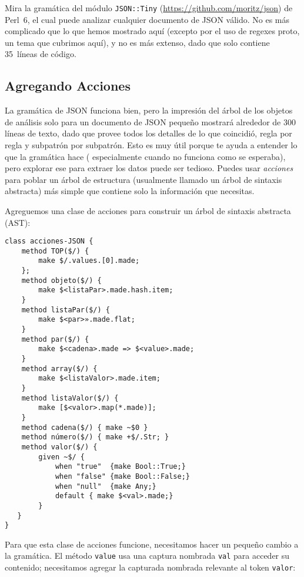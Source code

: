 Mira la gramática del módulo {\tt JSON::Tiny} 
(\url{https://github.com/moritz/json}) de Perl~6,
el cual puede analizar cualquier documento de JSON válido.
No es más complicado que lo que hemos mostrado aquí (excepto
por el uso de regexes proto, un tema que cubrimos aquí),
y no es más extenso, dado que solo contiene 35~líneas de
código.

\subsection{Agregando Acciones}

La gramática de JSON funciona bien, pero la impresión
del árbol de los objetos de análisis solo para un documento
de JSON pequeño mostrará alrededor de 300 líneas de texto,
dado que provee todos los detalles de lo que coincidió, 
regla por regla y subpatrón por subpatrón. Esto es muy útil
porque te ayuda a entender lo que la gramática hace (
especialmente cuando no funciona como se esperaba), 
pero explorar ese para extraer los datos puede ser tedioso.
Puedes usar \emph{acciones} para poblar un árbol de estructura
(usualmente llamado un árbol de sintaxis abstracta) más 
simple que contiene solo la información que necesitas.

Agreguemos una clase de acciones para construir un árbol
de sintaxis abstracta (AST):

\begin{verbatim}
class acciones-JSON {
    method TOP($/) {
        make $/.values.[0].made;
    };
    method objeto($/) {
        make $<listaPar>.made.hash.item;
    }
    method listaPar($/) {
        make $<par>».made.flat;
    }
    method par($/) {
        make $<cadena>.made => $<value>.made;
    }
    method array($/) {
        make $<listaValor>.made.item;
    }
    method listaValor($/) {
        make [$<valor>.map(*.made)];
    }
    method cadena($/) { make ~$0 }
    method número($/) { make +$/.Str; }
    method valor($/) { 
        given ~$/ {
            when "true"  {make Bool::True;}
            when "false" {make Bool::False;}
            when "null"  {make Any;}
            default { make $<val>.made;}
        }  
   }
}
\end{verbatim}

Para que esta clase de acciones funcione, necesitamos hacer un
pequeño cambio a la gramática. El método {\tt value} usa una
captura nombrada {\tt val} para acceder su contenido; necesitamos
agregar la capturada nombrada relevante al token {\tt valor}:

